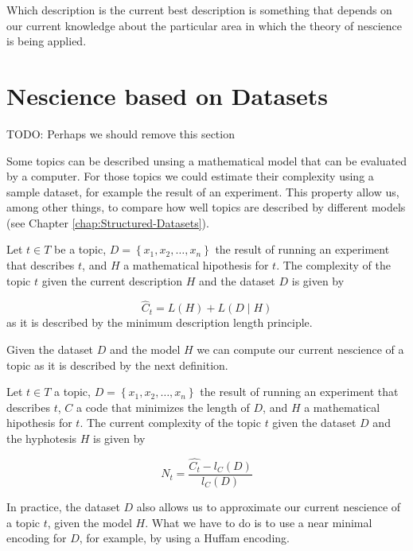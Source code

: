 Which description is the current best description is something that depends on our current knowledge about the particular area in which the theory of nescience is being applied.


%
%

\section{Nescience based on Datasets}
\label{sec:nescience_datasets}

{\color{red} TODO: Perhaps we should remove this section}

Some topics can be described unsing a mathematical model that can
be evaluated by a computer. For those topics we could estimate their
complexity using a sample dataset, for example the result of an experiment.
This property allow us, among other things, to compare how well topics
are described by different models (see Chapter \ref{chap:Structured-Datasets}).

\begin{definition}
Let $t\in T$ be a topic, $D=\left\{ x_{1},x_{2},\ldots,x_{n}\right\} $
the result of running an experiment that describes $t$, and $H$
a mathematical hipothesis for $t$. The complexity of the topic $t$
given the current description $H$ and the dataset $D$ is given by

\[
\hat{C}_{t}=L(H)+L(D\mid H)
\]
as it is described by the minimum description length principle.
\end{definition}

Given the dataset $D$ and the model $H$ we can compute our current
nescience of a topic as it is described by the next definition.

\begin{definition}
Let $t\in T$ a topic, $D=\left\{ x_{1},x_{2},\ldots,x_{n}\right\} $
the result of running an experiment that describes $t$, $C$ a code
that minimizes the length of $D$, and $H$ a mathematical hipothesis
for $t$. The current complexity of the topic $t$ given the dataset
$D$ and the hyphotesis $H$ is given by

\[
N_{t}=\frac{\hat{C_{t}}-l_{C}(D)}{l_{C}(D)}
\]

\end{definition}

In practice, the dataset $D$ also allows us to approximate our current
nescience of a topic $t$, given the model $H$. What we have to do
is to use a near minimal encoding for $D$, for example, by using
a Huffam encoding.


